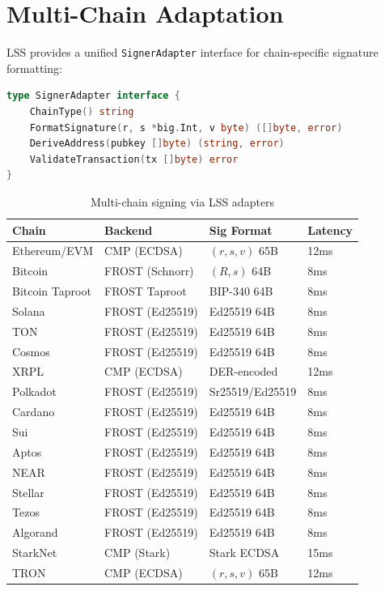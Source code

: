 \section{Multi-Chain Adaptation}


LSS provides a unified \texttt{SignerAdapter} interface for chain-specific signature formatting:

\begin{lstlisting}[language=Go,basicstyle=\ttfamily\scriptsize]
type SignerAdapter interface {
    ChainType() string
    FormatSignature(r, s *big.Int, v byte) ([]byte, error)
    DeriveAddress(pubkey []byte) (string, error)
    ValidateTransaction(tx []byte) error
}
\end{lstlisting}

\begin{table}[h]
\centering
\scriptsize
\begin{tabular}{llll}
\toprule
\textbf{Chain} & \textbf{Backend} & \textbf{Sig Format} & \textbf{Latency} \\
\midrule
Ethereum/EVM & CMP (ECDSA) & $(r, s, v)$ 65B & 12ms \\
Bitcoin & FROST (Schnorr) & $(R, s)$ 64B & 8ms \\
Bitcoin Taproot & FROST Taproot & BIP-340 64B & 8ms \\
Solana & FROST (Ed25519) & Ed25519 64B & 8ms \\
TON & FROST (Ed25519) & Ed25519 64B & 8ms \\
Cosmos & FROST (Ed25519) & Ed25519 64B & 8ms \\
XRPL & CMP (ECDSA) & DER-encoded & 12ms \\
Polkadot & FROST (Ed25519) & Sr25519/Ed25519 & 8ms \\
Cardano & FROST (Ed25519) & Ed25519 64B & 8ms \\
Sui & FROST (Ed25519) & Ed25519 64B & 8ms \\
Aptos & FROST (Ed25519) & Ed25519 64B & 8ms \\
NEAR & FROST (Ed25519) & Ed25519 64B & 8ms \\
Stellar & FROST (Ed25519) & Ed25519 64B & 8ms \\
Tezos & FROST (Ed25519) & Ed25519 64B & 8ms \\
Algorand & FROST (Ed25519) & Ed25519 64B & 8ms \\
StarkNet & CMP (Stark) & Stark ECDSA & 15ms \\
TRON & CMP (ECDSA) & $(r, s, v)$ 65B & 12ms \\
\bottomrule
\end{tabular}
\caption{Multi-chain signing via LSS adapters}
\label{tab:chains}
\end{table}

